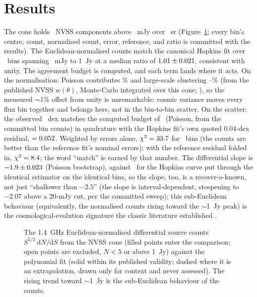 \documentclass[twocolumn]{aastex631}
\begin{document}
\section{Results}
The cone holds \scNsrc\ NVSS components above \scSmin~mJy over \scArea~sr
(Figure~\ref{fig:counts}; every bin's centre, count, normalised count, error, reference, and
ratio is committed with the results). The Euclidean-normalised counts match the canonical
Hopkins fit over \scNbins\ bins spanning \scSmin~mJy to 1~Jy at a median ratio of
$1.01\pm0.021$, consistent with unity. The agreement budget is computed, and each
term lands where it acts. On the normalisation: Poisson contributes
\scPoissonNormPct\% and large-scale clustering \scCvLo--\scCvHi\% (from the published NVSS
$w(\theta)$, Monte-Carlo integrated over this cone; \citealt{blake2002}), so the measured
$\sim$1\% offset from unity is unremarkable: cosmic variance moves every flux bin together
and belongs here, not in the bin-to-bin scatter. On the scatter: the observed
\scScatter~dex matches the computed budget of \scPoissonDex\ (Poisson, from the committed bin
counts) in quadrature with the Hopkins fit's own quoted 0.04-dex residual, $=0.052$.
Weighted by errors alone, $\chi^2=33.7$ for \scNbins\ bins (the counts are better than
the reference fit's nominal errors); with the reference residual folded in,
$\chi^2=8.4$; the word ``match'' is earned by that number. The differential slope is
$-1.9\pm0.023$ (Poisson bootstrap), against \scSlopeRef\ for the Hopkins curve put
through the identical estimator on the identical bins, so the slope, too, is a
recover-a-known, not just ``shallower than $-2.5$'' (the slope is interval-dependent, steepening
to $-2.07$ above a 20-mJy cut, per the committed sweep); this sub-Euclidean behaviour
(equivalently, the normalised counts rising toward the $\sim$1~Jy peak) is the
cosmological-evolution signature the classic literature established \citep{condon1984}.

\begin{figure}
\caption{The 1.4~GHz Euclidean-normalised differential source counts $S^{5/2}\,\mathrm{d}N/\mathrm{d}S$
from the NVSS cone (filled points enter the comparison; open points are excluded, $N<5$ or above
1~Jy) against the \citet{hopkins2003} polynomial fit (solid within its published validity;
dashed where it is an extrapolation, drawn only for context and never assessed). The rising
trend toward $\sim$1~Jy is the sub-Euclidean behaviour of the counts.}
\label{fig:counts}
\end{figure}
\end{document}
